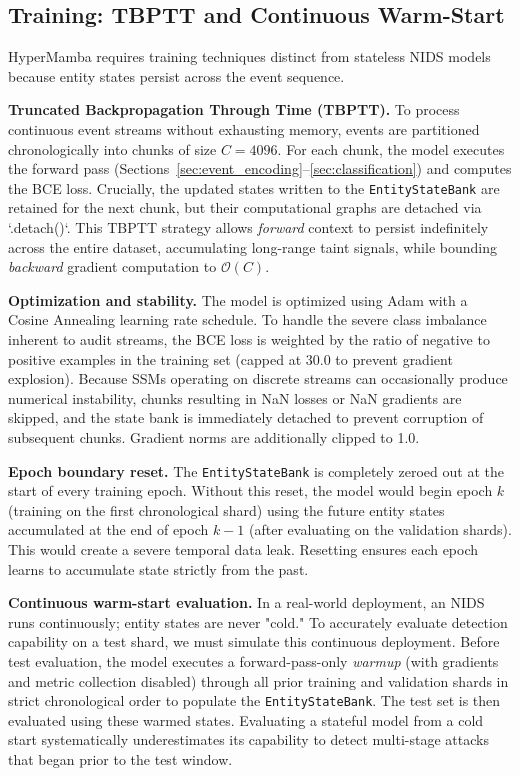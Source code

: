 \documentclass[letterpaper,twocolumn,10pt]{article}
\begin{document}
\subsection{Training: TBPTT and Continuous Warm-Start}
\label{sec:training}

HyperMamba requires training techniques distinct from stateless NIDS models because entity states persist across the event sequence.

\textbf{Truncated Backpropagation Through Time (TBPTT).} To process continuous event streams without exhausting memory, events are partitioned chronologically into chunks of size $C = 4096$. For each chunk, the model executes the forward pass (Sections~\ref{sec:event_encoding}--\ref{sec:classification}) and computes the BCE loss. Crucially, the updated states written to the \texttt{EntityStateBank} are retained for the next chunk, but their computational graphs are detached via `.detach()`. This TBPTT strategy allows \emph{forward} context to persist indefinitely across the entire dataset, accumulating long-range taint signals, while bounding \emph{backward} gradient computation to $\mathcal{O}(C)$. 

\textbf{Optimization and stability.} The model is optimized using Adam with a Cosine Annealing learning rate schedule. To handle the severe class imbalance inherent to audit streams, the BCE loss is weighted by the ratio of negative to positive examples in the training set (capped at 30.0 to prevent gradient explosion). Because SSMs operating on discrete streams can occasionally produce numerical instability, chunks resulting in NaN losses or NaN gradients are skipped, and the state bank is immediately detached to prevent corruption of subsequent chunks. Gradient norms are additionally clipped to 1.0.

\textbf{Epoch boundary reset.} The \texttt{EntityStateBank} is completely zeroed out at the start of every training epoch. Without this reset, the model would begin epoch $k$ (training on the first chronological shard) using the future entity states accumulated at the end of epoch $k-1$ (after evaluating on the validation shards). This would create a severe temporal data leak. Resetting ensures each epoch learns to accumulate state strictly from the past.

\textbf{Continuous warm-start evaluation.} In a real-world deployment, an NIDS runs continuously; entity states are never "cold." To accurately evaluate detection capability on a test shard, we must simulate this continuous deployment. Before test evaluation, the model executes a forward-pass-only \emph{warmup} (with gradients and metric collection disabled) through all prior training and validation shards in strict chronological order to populate the \texttt{EntityStateBank}. The test set is then evaluated using these warmed states. Evaluating a stateful model from a cold start systematically underestimates its capability to detect multi-stage attacks that began prior to the test window.
\end{document}
